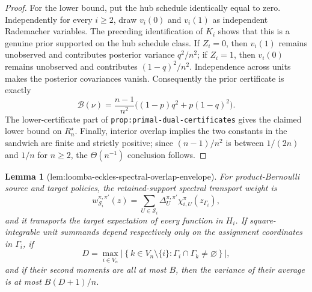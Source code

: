 \documentclass{article}
\newtheorem{lemma}{Lemma}
\begin{document}
\begin{proof}
For the lower bound, put the hub schedule identically equal to zero.  Independently for every \(i\ge2\), draw \(v_i(0)\) and \(v_i(1)\) as independent Rademacher variables.  The preceding identification of \(K_i\) shows that this is a genuine prior supported on the hub schedule class.  If \(Z_i=0\), then \(v_i(1)\) remains unobserved and contributes posterior variance \(q^2/n^2\); if \(Z_i=1\), then \(v_i(0)\) remains unobserved and contributes \((1-q)^2/n^2\).  Independence across units makes the posterior covariances vanish.  Consequently the prior certificate is exactly
\[
 \mathcal B(\nu)
 =\frac{n-1}{n^2}\bigl((1-p)q^2+p(1-q)^2\bigr).
\]
The lower-certificate part of \texttt{prop:primal-dual-certificates} gives the claimed lower bound on \(R_n^{\star}\).  Finally, interior overlap implies the two constants in the sandwich are finite and strictly positive; since \((n-1)/n^2\) is between \(1/(2n)\) and \(1/n\) for \(n\ge2\), the \(\Theta(n^{-1})\) conclusion follows.
\end{proof}

\begin{lemma}[lem:loomba-eckles-spectral-overlap-envelope]\label{lem:loomba-eckles-spectral-overlap-envelope}
For product-Bernoulli source and target policies, the retained-support spectral transport weight is
\[
 w_{\mathcal S_i}^{\pi,\pi'}(z)
 =\sum_{U\in\mathcal S_i}\Delta_U^{\pi,\pi'}
   \chi_{i,U}^{\pi}(z_{\Gamma_i}),
\]
and it transports the target expectation of every function in \(H_i\).  If square-integrable unit summands depend respectively only on the assignment coordinates in \(\Gamma_i\), if
\[
 D=\max_{i\in V_n}
 \left|\left\{k\in V_n\setminus\{i\}:\Gamma_i\cap\Gamma_k\ne\varnothing\right\}\right|,
\]
and if their second moments are all at most \(B\), then the variance of their average is at most \(B(D+1)/n\).
\end{lemma}
\end{document}

